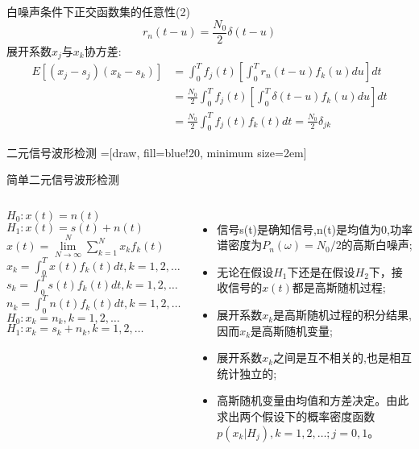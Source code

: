 \begin{frame}{白噪声条件下正交函数集的任意性(2)}
\[r_n(t-u)=\frac{N_0}{2}\delta(t-u) \]
展开系数$x_j$与$x_k$协方差:
\begin{align*}
E[(x_j-s_j)(x_k-s_k)]&=\int_{0}^{T}f_j(t)\left[\int_{0}^{T}r_n(t-u)f_k(u)du\right]dt\\
&=\frac{N_0}{2}\int_{0}^{T}f_j(t)\left[\int_{0}^{T}\delta(t-u)f_k(u)du\right]dt\\
&=\frac{N_0}{2}\int_{0}^{T}f_j(t)f_k(t)dt=\frac{N_0}{2}\delta_{jk}
\end{align*}
\end{frame}

\begin{frame}{二元信号波形检测}
=[draw, fill=blue!20, minimum size=2em]
\end{frame}

\begin{frame}{简单二元信号波形检测}
\begin{columns}
	$H_0: x(t)=n(t)$\\
	$H_1: x(t)=s(t)+n(t)$\\
	$x(t)=\lim\limits_{N\to\infty}^N\sum\limits_{k=1}^Nx_kf_k(t)$\\
	$x_k=\int_{0}^{T}x(t)f_k(t)dt, k=1,2,\dots$\\
	$s_k=\int_{0}^{T}s(t)f_k(t)dt, k=1,2,\dots$\\
	$n_k=\int_{0}^{T}n(t)f_k(t)dt, k=1,2,\dots$\\
	$H_0: x_k=n_k,k=1,2,\dots$\\
	$H_1: x_k=s_k+n_k,k=1,2,\dots$
	\begin{itemize}
		\item 信号s(t)是确知信号,n(t)是均值为0,功率谱密度为$P_n(\omega)=N_0/2$的高斯白噪声;
		\item 无论在假设$H_1$下还是在假设$H_2$下，接收信号的$x(t)$都是高斯随机过程;
		\item 展开系数$x_k$是高斯随机过程的积分结果,因而$x_k$是高斯随机变量;
		\item 展开系数$x_k$之间是互不相关的,也是相互统计独立的;
		\item 高斯随机变量由均值和方差决定。由此求出两个假设下的概率密度函数$p(x_k|H_j),k=1,2,\dots;j=0,1$。
	\end{itemize}
\end{columns}
\end{frame}

